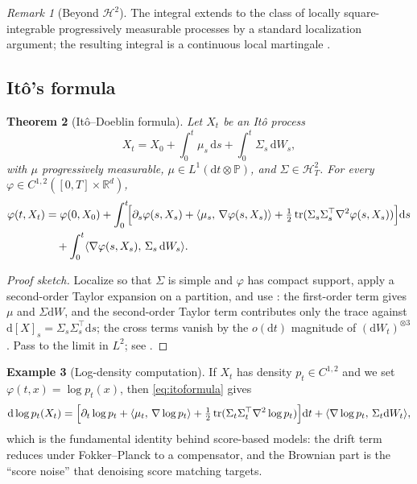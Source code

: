 \documentclass[11pt,letterpaper]{article}
\theoremstyle{plain}
\newtheorem{theorem}{Theorem}[section]
\theoremstyle{definition}
\newtheorem{example}[theorem]{Example}
\theoremstyle{remark}
\newtheorem{remark}[theorem]{Remark}
\newcommand{\R}{\mathbb{R}}
\newcommand{\Prob}{\mathbb{P}}
\newcommand{\dd}{\mathrm{d}}
\newcommand{\calH}{\mathcal{H}}
\newcommand{\tr}{\operatorname{tr}}
\newcommand{\grad}{\nabla}
\newcommand{\inner}[2]{\langle #1,\,#2\rangle}
\begin{document}
\begin{remark}[Beyond $\calH^2$]
The integral extends to the class of locally square-integrable progressively
measurable processes by a standard localization argument; the resulting
integral is a continuous local martingale \citep[Ch.~3.2]{karatzas1991bm}.
\end{remark}

\subsection{It\^o's formula}

\begin{theorem}[It\^o--Doeblin formula]\label{thm:itoformula}
Let $X_t$ be an It\^o process
\[
  X_t = X_0 + \int_0^t\mu_s\,\dd s + \int_0^t\Sigma_s\,\dd W_s,
\]
with $\mu$ progressively measurable, $\mu\in L^1(\dd t\otimes\Prob)$, and
$\Sigma\in\calH^2_T$. For every $\varphi\in C^{1,2}([0,T]\times\R^d)$,
\begin{align}
  \varphi(t,X_t)
  &= \varphi(0,X_0)
  + \int_0^t\!\Bigl[\partial_s\varphi(s,X_s)+\inner{\mu_s}{\grad\varphi(s,X_s)}
                +\tfrac12\tr(\Sigma_s\Sigma_s^\top\nabla^2\varphi(s,X_s))\Bigr]\dd s\nonumber\\
  &\quad + \int_0^t\inner{\grad\varphi(s,X_s)}{\Sigma_s\,\dd W_s}.
  \label{eq:itoformula}
\end{align}
\end{theorem}
\begin{proof}[Proof sketch]
Localize so that $\Sigma$ is simple and $\varphi$ has compact support,
apply a second-order Taylor expansion on a partition, and use
: the first-order term gives $\mu$ and $\Sigma\dd W$, and the
second-order Taylor term contributes only the trace against
$\dd[X]_s=\Sigma_s\Sigma_s^\top\dd s$; the cross terms vanish by the
$o(\dd t)$ magnitude of $(\dd W_t)^{\otimes 3}$. Pass to the limit in
$L^2$; see \citep[Thm.~3.3.6]{karatzas1991bm}.
\end{proof}

\begin{example}[Log-density computation]\label{ex:dlogp}
If $X_t$ has density $p_t\in C^{1,2}$ and we set
$\varphi(t,x)=\log p_t(x)$, then \eqref{eq:itoformula} gives
\[
  \dd\log p_t(X_t)
  = \Bigl[\partial_t\log p_t+\inner{\mu_t}{\grad\log p_t}
    +\tfrac12\tr(\Sigma_t\Sigma_t^\top\nabla^2\log p_t)\Bigr]\dd t
    +\inner{\grad\log p_t}{\Sigma_t\dd W_t},
\]
which is the fundamental identity behind score-based models: the drift
term reduces under Fokker--Planck to a compensator, and
the Brownian part is the ``score noise'' that denoising score matching
targets.
\end{example}
\end{document}
